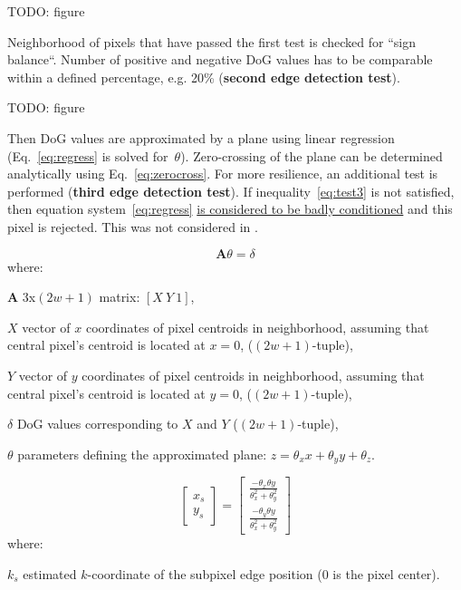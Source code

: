 TODO: figure

Neighborhood of pixels that have passed the first test is checked for ``sign balance``. Number of positive and negative DoG values has to be comparable within a defined percentage, e.g. 20\% (\textbf{second edge detection test}).

TODO: figure

Then DoG values are approximated by a plane using linear regression (Eq.~\ref{eq:regress} is solved for~$\theta$). Zero-crossing of the plane can be determined analytically using Eq.~\ref{eq:zerocross}. For more resilience, an additional test is performed (\textbf{third edge detection test}). If inequality~\ref{eq:test3} is not satisfied, then equation system~\ref{eq:regress} \underline{is considered to be badly conditioned} and this pixel is rejected. This was not considered in \cite{jose2015realtime}.

\begin{equation}
\bm{A}\theta = \delta
\label{eq:regress}
\end{equation}
where:
\begin{eqwhere}[2cm]
	\item[$\bm{A}$] 3x$(2w+1)$ matrix: $[X\ Y\ 1]$,
	\item[$X$] vector of $x$ coordinates of pixel centroids in neighborhood, assuming that central pixel's centroid is located at $x = 0$, ($(2w+1)$-tuple),
	\item[$Y$] vector of $y$ coordinates of pixel centroids in neighborhood, assuming that central pixel's centroid is located at $y = 0$, ($(2w+1)$-tuple),
	\item[$\delta$] DoG values corresponding to $X$ and $Y$ ($(2w+1)$-tuple),
	\item[$\theta$] parameters defining the approximated plane: $z = \theta_{x}x + \theta_{y}y + \theta_{z}$.
\end{eqwhere}



\begin{equation}
\begin{bmatrix}
x_s \\
y_s 
\end{bmatrix} = 
\begin{bmatrix}
\frac{-\theta_{x} \theta{y}}{\theta_x^2 + \theta_y^2} \\
\frac{-\theta_{y} \theta{y}}{\theta_x^2 + \theta_y^2}
\end{bmatrix}
\label{eq:zerocross}
\end{equation}
where:
\begin{eqwhere}[2cm]
	\item[$k_s$] estimated $k$-coordinate of the subpixel edge position (0 is the pixel center).
\end{eqwhere}

